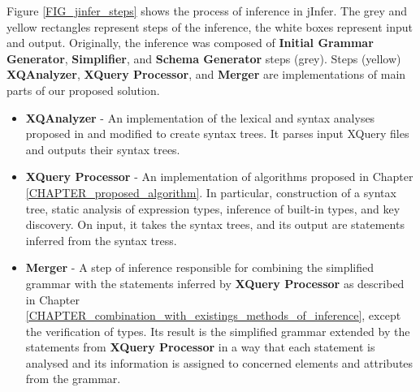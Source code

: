 Figure \ref{FIG_jinfer_steps} shows the process of inference in jInfer. The grey and yellow rectangles represent steps of the inference, the white boxes represent input and output. Originally, the inference was composed of \textbf{Initial Grammar Generator}, \textbf{Simplifier}, and \textbf{Schema Generator} steps (grey). Steps (yellow) \textbf{XQAnalyzer}, \textbf{XQuery Processor}, and \textbf{Merger} are implementations of main parts of our proposed solution.

\begin{itemize}
\item \textbf{XQAnalyzer} - An implementation of the lexical and syntax analyses proposed in \cite{thesis_schejbal} and modified to create syntax trees. It parses input XQuery files and outputs their syntax trees.
\item \textbf{XQuery Processor} - An implementation of algorithms proposed in Chapter \ref{CHAPTER_proposed_algorithm}. In particular, construction of a syntax tree, static analysis of expression types, inference of built-in types, and key discovery. On input, it takes the syntax trees, and its output are statements inferred from the syntax tress. 
\item \textbf{Merger} - A step of inference responsible for combining the simplified grammar with the statements inferred by \textbf{XQuery Processor} as described in Chapter \ref{CHAPTER_combination_with_existings_methods_of_inference}, except the verification of types. Its result is the simplified grammar extended by the statements from \textbf{XQuery Processor} in a way that each statement is analysed and its information is assigned to concerned elements and attributes from the grammar. 
\end{itemize}

